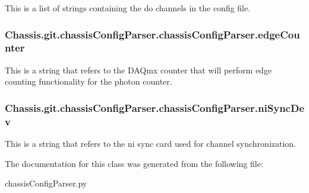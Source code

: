 This is a list of strings containing the do channels in the config file. 

\hypertarget{class_chassis_8git_1_1chassis_config_parser_1_1chassis_config_parser_af532aa2b066a478c55f7c525f4e76f2b}{
\subsubsection[{edge\-Counter}]{\setlength{\rightskip}{0pt plus 5cm}Chassis.\-git.\-chassis\-Config\-Parser.\-chassis\-Config\-Parser.\-edge\-Counter}}\label{class_chassis_8git_1_1chassis_config_parser_1_1chassis_config_parser_af532aa2b066a478c55f7c525f4e76f2b}


This is a string that refers to the D\-A\-Qmx counter that will perform edge counting functionality for the photon counter. 

\hypertarget{class_chassis_8git_1_1chassis_config_parser_1_1chassis_config_parser_afb537d5df40696da1456733f4f58071c}{
\subsubsection[{ni\-Sync\-Dev}]{\setlength{\rightskip}{0pt plus 5cm}Chassis.\-git.\-chassis\-Config\-Parser.\-chassis\-Config\-Parser.\-ni\-Sync\-Dev}}\label{class_chassis_8git_1_1chassis_config_parser_1_1chassis_config_parser_afb537d5df40696da1456733f4f58071c}


This is a string that refers to the ni sync card used for channel synchronization. 



The documentation for this class was generated from the following file\-:\begin{DoxyCompactItemize}
\item 
chassis\-Config\-Parser.\-py\end{DoxyCompactItemize}
